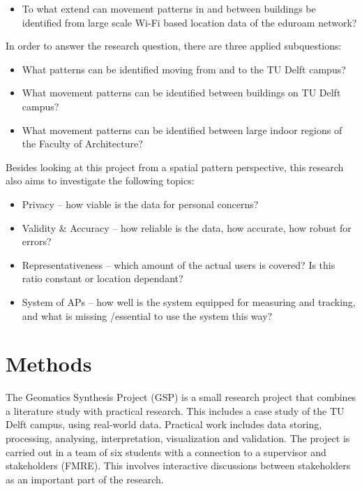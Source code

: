 \begin{itemize}
\item To what extend can movement patterns in and between buildings be identified from large scale Wi-Fi based location data of the eduroam network?
\end{itemize}
In order to answer the research question, there are three applied subquestions:
\begin{itemize}
\item What patterns can be identified moving from and to the TU Delft campus?
\item What movement patterns can be identified between buildings on TU Delft campus?
\item What movement patterns can be identified between large indoor regions of the Faculty of Architecture?
\end{itemize}
Besides looking at this project from a spatial pattern perspective, this research also aims to investigate the following topics:
\begin{itemize}
\item Privacy – how viable is the data for personal concerns?
\item Validity \& Accuracy – how reliable is the data, how accurate, how robust for errors?
\item Representativeness – which amount of the actual users is covered? Is this ratio constant or
location dependant? 
\item System of APs – how well is the system equipped for measuring and tracking, and what is missing /essential to use the system this way?
\end{itemize}

\section{Methods}\label{methods}
The Geomatics Synthesis Project (GSP) is a small research project that combines a literature study with practical research. This includes a case study of the TU Delft campus, using real-world data. Practical work includes data storing, processing, analysing, interpretation, visualization and validation. The project is carried out in a team of six students with a connection to a supervisor and stakeholders (FMRE). This involves interactive discussions between stakeholders as an important part of the research.


